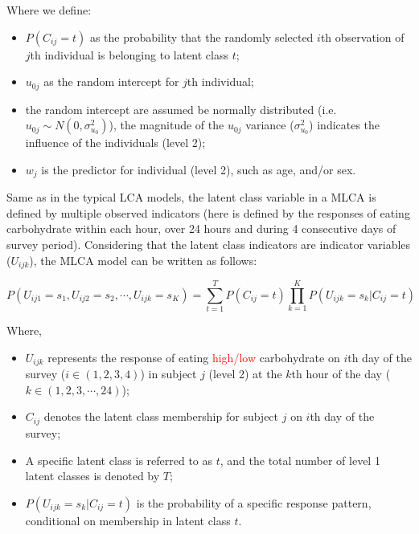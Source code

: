 Where we define: 

\begin{itemize}
	\item $P(C_{ij} = t)$ as the probability that the randomly selected $i$th observation of $j$th individual is belonging to latent class $t$;
	\item $u_{0j}$ as the random intercept for $j$th individual; 
	\item the random intercept are assumed be normally distributed (i.e. $u_{0j} \sim N(0, \sigma_{u_0}^2)$), the magnitude of the $u_{0j}$ variance ($\sigma_{u_0}^2$) indicates the influence of the individuals (level 2);
	\item $w_j$ is the predictor for individual (level 2), such as age, and/or sex.
\end{itemize}


Same as in the typical LCA models, the latent class variable in a MLCA is defined by multiple observed indicators (here is defined by the responses of eating carbohydrate within each hour, over 24 hours and during 4 consecutive days of survey period). Considering that the latent class indicators are indicator variables ($U_{ijk}$), the MLCA model can be written as follows:\vspace{-0.8cm}

\begin{equation}
P(U_{ij1} = s_1, U_{ij2} = s_2, \cdots, U_{ijk} = s_{K}) = \sum_{t=1}^{T}P(C_{ij}=t)\prod_{k=1}^{K}P(U_{ijk} = s_k | C_{ij} = t)
\label{MLCA}
\end{equation}
\vspace{-0.8cm}


Where, 

\begin{itemize}
	\item $ U_{ijk} $ represents the response of eating \textcolor{red}{high/low} carbohydrate on $i$th day of the survey ($i \in (1,2,3,4)$) in subject $j$ (level 2) at the $k$th hour of the day ($k \in (1, 2, 3, \cdots, 24)$);
	\item $C_{ij}$ denotes the latent class membership for subject $j$ on $i$th day of the survey;
	\item A specific latent class is referred to as $t$, and the total number of level 1 latent classes is denoted by $T$;
	\item $P(U_{ijk} = s_k|C_{ij} = t)$ is the probability of a specific response pattern, conditional on membership in latent class $t$.
\end{itemize}


